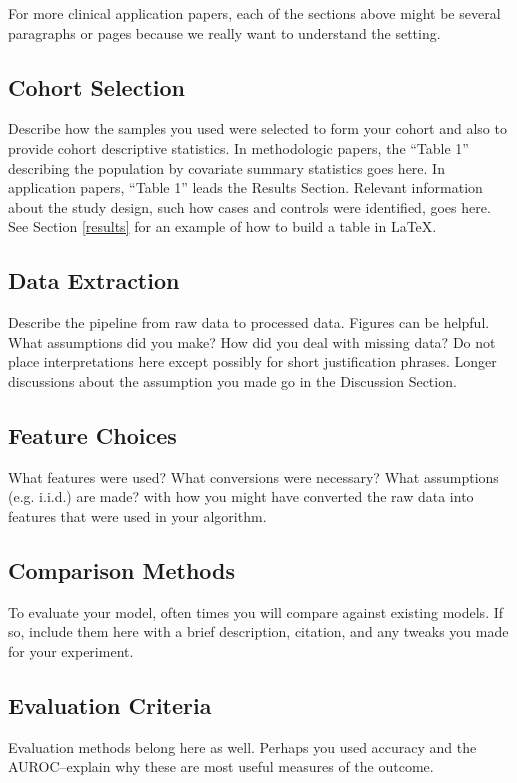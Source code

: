 \documentclass[twoside,11pt]{article}
\begin{document}
For more clinical application papers, each of the sections above might be several paragraphs or pages because we really want to understand the setting.

\subsection{Cohort Selection} 
Describe how the samples you used were selected to form your cohort and also to provide cohort descriptive statistics. In methodologic papers, the ``Table 1'' describing the population by covariate summary statistics goes here. In application papers, ``Table 1'' leads the Results Section. Relevant information about the study design, such how cases and controls were identified, goes here. See Section \ref{results} for an example of how to build a table in LaTeX.

\subsection{Data Extraction} 
Describe the pipeline from raw data to processed data. Figures can be helpful. What assumptions did you make? How did you deal with missing data? Do not place interpretations here except possibly for short justification phrases. Longer discussions about the assumption you made go in the Discussion Section.

\subsection{Feature Choices} 
What features were used? What conversions were necessary? What assumptions (e.g. i.i.d.) are made? with how you might have converted the raw data into features that were used in your algorithm. 

\subsection{Comparison Methods}
To evaluate your model, often times you will compare against existing models.
If so, include them here with a brief description, citation, and any tweaks you made for your experiment.

\subsection{Evaluation Criteria}
Evaluation methods belong here as well.
Perhaps you used accuracy and the AUROC--explain why these are most useful measures of the outcome.
\end{document}
